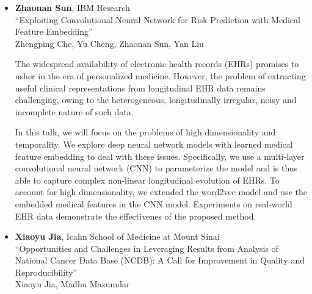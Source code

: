 \begin{itemize}
\item \textbf{Zhaonan Sun}, IBM Research \\
``Exploiting Convolutional Neural Network for Risk Prediction with Medical Feature Embedding'' \\
Zhengping Che, Yu Cheng, Zhaonan Sun, Yan Liu


The widespread availability of electronic health records (EHRs) promises to usher in the era of personalized medicine. However, the problem of extracting useful clinical representations from longitudinal EHR data remains challenging, owing to the heterogeneous, longitudinally irregular, noisy and incomplete nature of such data.

In this talk, we will focus on the problems of high dimensionality and temporality. We explore deep neural network models with learned medical feature embedding to deal with these issues. Specifically, we use a multi-layer convolutional neural network (CNN) to parameterize the model and is thus able to capture complex non-linear longitudinal evolution of EHRs. To account for high dimensionality, we extended the word2vec model and use the embedded medical features in the CNN model. Experiments on real-world EHR data demonstrate the effectivenes of the proposed method. 

\item \textbf{Xiaoyu Jia}, Icahn School of Medicine at Mount Sinai \\
``Opportunities and Challenges in Leveraging Results from Analysis of National Cancer Data Base (NCDB): A Call for Improvement in Quality and Reproducibility'' \\
Xiaoyu Jia, Madhu Mazumdar



\end{itemize}
